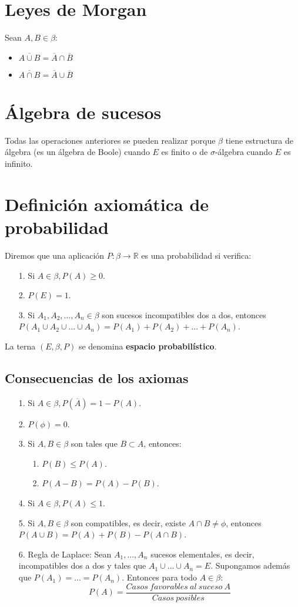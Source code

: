 \section{Leyes de Morgan}
Sean $A, B \in \beta$:
\begin{itemize}
\item $\overline{A \cup B} = \overline{A} \cap \overline{B}$
\item $\overline{A \cap B} = \overline{A} \cup \overline{B}$
\end{itemize}


\section{Álgebra de sucesos}
Todas las operaciones anteriores se pueden realizar porque $\beta$ tiene estructura de álgebra (es un álgebra de Boole) cuando $E$ es finito o de $\sigma$-álgebra cuando $E$ es infinito.


\section{Definición axiomática de probabilidad}
Diremos que una aplicación $P: \beta \rightarrow \mathbb{R}$ es una probabilidad si verifica:
\begin{itemize}
\item[1.]Si $A \in \beta, P(A) \geq 0$.
\item[2.]$P(E) = 1$.
\item[3.]Si $A_{1},A_{2},...,A_{n} \in \beta$ son sucesos incompatibles dos a dos, entonces $P(A_{1} \cup A_{2} \cup ... \cup A_{n}) = P(A_{1}) + P(A_{2}) + ... + P(A_{n})$.
\end{itemize}
La terna $(E,\beta,P)$ se denomina \textbf{espacio probabilístico}.

\subsection{Consecuencias de los axiomas}
\begin{itemize}
\item[1.]Si $A \in \beta, P(\overline{A}) = 1 - P(A)$.
\item[2.]$P(\phi)=0$.
\item[3.]Si $A,B \in \beta$ son tales que $B \subset A$, entonces:
\begin{itemize}
\item[1.]$P(B) \leq P(A)$.
\item[2.]$P(A-B)=P(A)-P(B)$.
\end{itemize}
\item[4.]Si $A \in \beta, P(A)\leq1$.
\item[5.]Si $A, B \in \beta$ son compatibles, es decir, existe $A \cap B \neq \phi$, entonces $P(A \cup B)=P(A)+P(B)-P(A \cap B)$.
\item[6.]Regla de Laplace: Sean $A_{1},...,A_{n}$ sucesos elementales, es decir, incompatibles dos a dos y tales que $A_{1} \cup ... \cup A_{n} = E$. Supongamos además que $P(A_{1})=...=P(A_{n})$. Entonces para todo $A \in \beta$:
\[P(A)= \frac{Casos\:favorables\:al\:suceso\:A}{Casos\:posibles}\]
\end{itemize}

